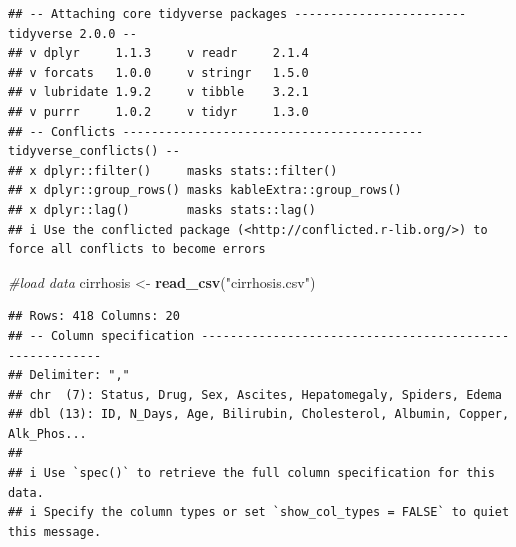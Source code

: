 \documentclass[
]{article}
\newenvironment{Shaded}{\begin{snugshade}}{\end{snugshade}}
\newcommand{\CommentTok}[1]{\textcolor[rgb]{0.56,0.35,0.01}{\textit{#1}}}
\newcommand{\FunctionTok}[1]{\textcolor[rgb]{0.13,0.29,0.53}{\textbf{#1}}}
\newcommand{\NormalTok}[1]{#1}
\newcommand{\OtherTok}[1]{\textcolor[rgb]{0.56,0.35,0.01}{#1}}
\newcommand{\StringTok}[1]{\textcolor[rgb]{0.31,0.60,0.02}{#1}}
\begin{document}
\begin{verbatim}
## -- Attaching core tidyverse packages ------------------------ tidyverse 2.0.0 --
## v dplyr     1.1.3     v readr     2.1.4
## v forcats   1.0.0     v stringr   1.5.0
## v lubridate 1.9.2     v tibble    3.2.1
## v purrr     1.0.2     v tidyr     1.3.0
## -- Conflicts ------------------------------------------ tidyverse_conflicts() --
## x dplyr::filter()     masks stats::filter()
## x dplyr::group_rows() masks kableExtra::group_rows()
## x dplyr::lag()        masks stats::lag()
## i Use the conflicted package (<http://conflicted.r-lib.org/>) to force all conflicts to become errors
\end{verbatim}

\begin{Shaded}
\begin{Highlighting}[]
\CommentTok{\#load data}
\NormalTok{cirrhosis }\OtherTok{\textless{}{-}} \FunctionTok{read\_csv}\NormalTok{(}\StringTok{"cirrhosis.csv"}\NormalTok{)}
\end{Highlighting}
\end{Shaded}

\begin{verbatim}
## Rows: 418 Columns: 20
## -- Column specification --------------------------------------------------------
## Delimiter: ","
## chr  (7): Status, Drug, Sex, Ascites, Hepatomegaly, Spiders, Edema
## dbl (13): ID, N_Days, Age, Bilirubin, Cholesterol, Albumin, Copper, Alk_Phos...
## 
## i Use `spec()` to retrieve the full column specification for this data.
## i Specify the column types or set `show_col_types = FALSE` to quiet this message.
\end{verbatim}
\end{document}
